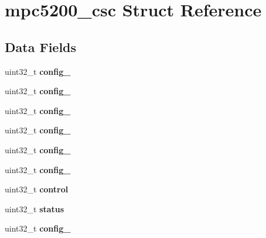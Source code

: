 \hypertarget{structmpc5200__csc}{}\section{mpc5200\+\_\+csc Struct Reference}
\label{structmpc5200__csc}
\subsection*{Data Fields}
\begin{DoxyCompactItemize}
\item 
\mbox{\label{structmpc5200__csc_a462f5e0e53bfc34f609455d9fadc04fa}} 
uint32\+\_\+t {\bfseries config\+\_}
\item 
\mbox{\label{structmpc5200__csc_a793e9d0f518d69fc4261ec4f631a9ab3}} 
uint32\+\_\+t {\bfseries config\+\_}
\item 
\mbox{\label{structmpc5200__csc_ae0e6fd58f1de88c5675b71e6344531f1}} 
uint32\+\_\+t {\bfseries config\+\_}
\item 
\mbox{\label{structmpc5200__csc_a3743cc332efe7d28afe6e9a72e68ffd5}} 
uint32\+\_\+t {\bfseries config\+\_}
\item 
\mbox{\label{structmpc5200__csc_a271af5d8cda6c579ef8938ad04b3ecab}} 
uint32\+\_\+t {\bfseries config\+\_}
\item 
\mbox{\label{structmpc5200__csc_a792e1be677e83c893b7127e6675c8267}} 
uint32\+\_\+t {\bfseries config\+\_}
\item 
\mbox{\label{structmpc5200__csc_a04e156d3fd7d5e4405cc24b426847c65}} 
uint32\+\_\+t {\bfseries control}
\item 
\mbox{\label{structmpc5200__csc_a618bd9fc2acfb8d6357de1d7a73fc45d}} 
uint32\+\_\+t {\bfseries status}
\item 
\mbox{\label{structmpc5200__csc_af65a08f0b8cf172f27178e546d402d94}} 
uint32\+\_\+t {\bfseries config\+\_}
\item 
\mbox{\label{structmpc5200__csc_a8bd9df61f2ef4a13c267545b7c23567b}} 

\end{DoxyCompactItemize}
